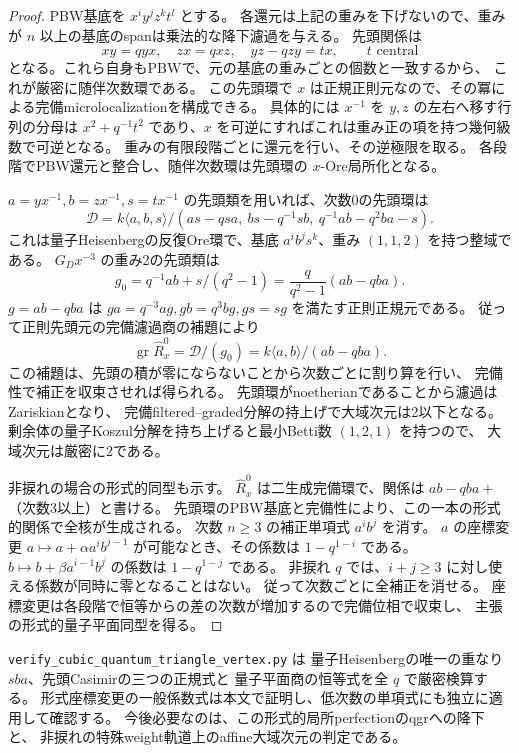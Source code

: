 \begin{proof}
PBW基底を $x^iy^jz^kt^l$ とする。
各還元は上記の重みを下げないので、重みが $n$ 以上の基底のspanは乗法的な降下濾過を与える。
先頭関係は
\[
 xy=qyx,\quad zx=qxz,\quad yz-qzy=tx,
 \qquad t\text{ central}
\]
となる。これら自身もPBWで、元の基底の重みごとの個数と一致するから、
これが厳密に随伴次数環である。
この先頭環で $x$ は正規正則元なので、その冪による完備microlocalizationを構成できる。
具体的には $x^{-1}$ を $y,z$ の左右へ移す行列の分母は
$x^2+q^{-1}t^2$ であり、$x$ を可逆にすればこれは重み正の項を持つ幾何級数で可逆となる。
重みの有限段階ごとに還元を行い、その逆極限を取る。
各段階でPBW還元と整合し、随伴次数環は先頭環の $x$-Ore局所化となる。

$a=yx^{-1},b=zx^{-1},s=tx^{-1}$ の先頭類を用いれば、次数0の先頭環は
\[
 \mathcal D=
 k\langle a,b,s\rangle/
 (as-qsa,\ bs-q^{-1}sb,\ q^{-1}ab-q^2ba-s).
\]
これは量子Heisenbergの反復Ore環で、基底 $a^ib^js^k$、重み $(1,1,2)$ を持つ整域である。
$G_Dx^{-3}$ の重み2の先頭類は
\[
 g_0=q^{-1}ab+s/(q^2-1)
     =\frac q{q^2-1}(ab-qba).
\]
$g=ab-qba$ は
$ga=q^{-3}ag,gb=q^3bg,gs=sg$ を満たす正則正規元である。
従って正則先頭元の完備濾過商の補題により
\[
 \operatorname{gr}\widehat R_x^0=\mathcal D/(g_0)
       =k\langle a,b\rangle/(ab-qba).
\]
この補題は、先頭の積が零にならないことから次数ごとに割り算を行い、
完備性で補正を収束させれば得られる。
先頭環がnoetherianであることから濾過はZariskianとなり、
完備filtered--graded分解の持上げで大域次元は2以下となる。
剰余体の量子Koszul分解を持ち上げると最小Betti数 $(1,2,1)$ を持つので、
大域次元は厳密に2である。

非捩れの場合の形式的同型も示す。
$\widehat R_x^0$ は二生成完備環で、関係は
$ab-qba+$（次数3以上）と書ける。
先頭環のPBW基底と完備性により、この一本の形式的関係で全核が生成される。
次数 $n\ge3$ の補正単項式 $a^ib^j$ を消す。
$a$ の座標変更 $a\mapsto a+\alpha a^ib^{j-1}$ が可能なとき、その係数は
$1-q^{1-i}$ である。
$b\mapsto b+\beta a^{i-1}b^j$ の係数は $1-q^{1-j}$ である。
非捩れ $q$ では、$i+j\ge3$ に対し使える係数が同時に零となることはない。
従って次数ごとに全補正を消せる。
座標変更は各段階で恒等からの差の次数が増加するので完備位相で収束し、
主張の形式的量子平面同型を得る。
\end{proof}

\texttt{verify\_cubic\_quantum\_triangle\_\allowbreak vertex.py} は
量子Heisenbergの唯一の重なり $sba$、先頭Casimirの三つの正規式と
量子平面商の恒等式を全 $q$ で厳密検算する。
形式座標変更の一般係数式は本文で証明し、低次数の単項式にも独立に適用して確認する。
今後必要なのは、この形式的局所perfectionのqgrへの降下と、
非捩れの特殊weight軌道上のaffine大域次元の判定である。
